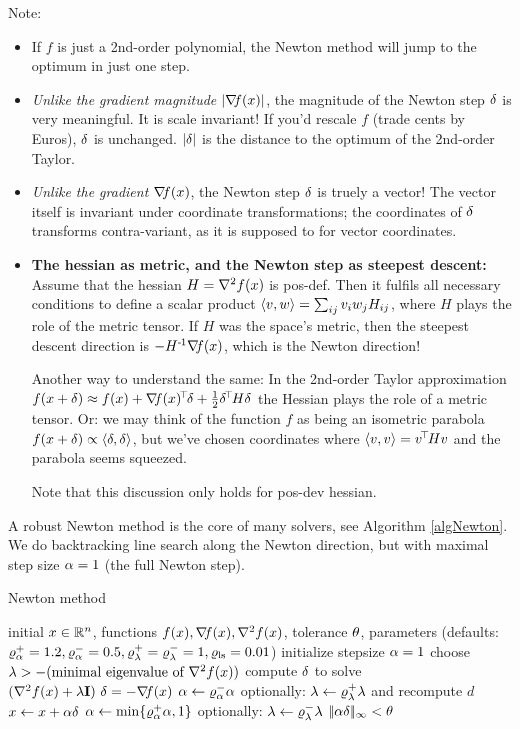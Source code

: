 Note:
\begin{itemize}
\item If $f$ is just a 2nd-order polynomial, the Newton method will
jump to the optimum in just one step.

\item \emph{Unlike the gradient magnitude $|{\nabla_{\!\!}} f(x)|$}, the magnitude of the
Newton step $\delta$ is very meaningful. It is scale invariant! If you'd
rescale $f$ (trade cents by Euros), $\delta$ is unchanged. $|\delta|$ is the
distance to the optimum of the 2nd-order Taylor.

\item \emph{Unlike the gradient ${\nabla_{\!\!}} f(x)$}, the Newton step $\delta$ is truely a
vector! The vector itself is invariant under coordinate
transformations; the coordinates of $\delta$ transforms contra-variant,
as it is supposed to for vector coordinates.

\item \textbf{The hessian as metric, and the Newton step as steepest descent:} Assume that the hessian $H = {\nabla_{\!\!}^2}
f(x)$ is pos-def. Then it fulfils all necessary conditions to define a
scalar product $\langle v ,w\rangle = \sum_{ij} v_i w_j H_{ij}$, where $H$ plays
the role of the metric tensor. If $H$ was the space's metric, then the
steepest descent direction is $- H^{{\hspace*{-.0pt}\text{\rm -}\hspace*{-.5pt}}1} {\nabla_{\!\!}} f(x)$, which is the Newton
direction!

Another way to understand the same: In the 2nd-order Taylor
approximation $f(x+\delta) \approx f(x) + {\nabla_{\!\!}} f(x)^{\!\top\!}\delta + \frac{1}{2} \delta^{\!\top\!} H
\delta$ the Hessian plays the role of a metric tensor. Or: we may think
of the function $f$ as being an isometric parabola $f(x+\delta) \propto
\langle\delta,\delta\rangle$, but we've chosen coordinates where $\langle v,v\rangle = v^{\!\top\!} H v$ and
the parabola seems squeezed.

Note that this discussion only holds for pos-dev hessian.
\end{itemize}

A robust Newton method is the core of many solvers, see Algorithm
\ref{algNewton}. We do backtracking line search along the Newton
direction, but with maximal step size $\alpha=1$ (the full Newton step).

\begin{algorithm}
\caption{\label{algNewton} Newton method}
\begin{algorithmic}[1]
\Require initial $x\in{\mathbb{R}}^n$, functions $f(x), {\nabla_{\!\!}} f(x), {\nabla_{\!\!}^2} f(x)$,
tolerance $\theta$, parameters (defaults:
$\varrho_\alpha^+=1.2, \varrho_\alpha^-=0.5, \varrho_\lambda^+=\varrho_\lambda^-=1, \varrho_{\text{ls}}=0.01$)
\State initialize stepsize $\alpha=1$
\Repeat
\State choose $\lambda>-(\text{minimal eigenvalue of ${\nabla_{\!\!}^2} f(x)$})$
\State compute ${\delta}$ to solve $({\nabla_{\!\!}^2} f(x) + \lambda {\rm\bf I})~ {\delta} = - {\nabla_{\!\!}}
f(x)$ \label{alg0}
 
\State $\alpha \gets \varrho_\alpha^-\alpha$ 
\State optionally: $\lambda \gets \varrho_\lambda^+\lambda$ and recompute $d$ 
\EndWhile
\State $x \gets x + \alpha{\delta}$ 
\State $\alpha \gets \min\{\varrho_\alpha^+\alpha,1\}$ 
\State optionally: $\lambda \gets \varrho_\lambda^-\lambda$ 
\Until $|\!|\alpha{\delta}|\!|_\infty < \theta$
\end{algorithmic}
\end{algorithm}

